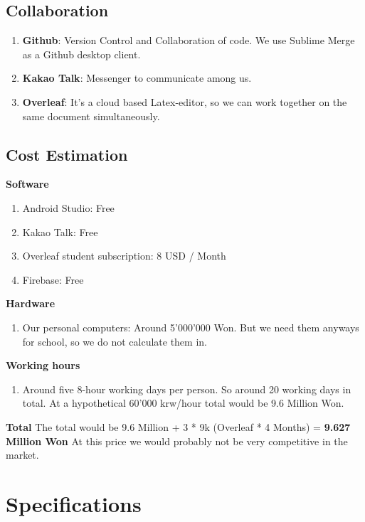 \documentclass[conference]{IEEEtran}
\numberwithin{figure}{subsection}
\begin{document}
\subsection{Collaboration}
\begin{enumerate}
 \item \textbf{Github}: Version Control and Collaboration of code. We use Sublime Merge as a Github desktop client.
 \newline
 \item \textbf{Kakao Talk}: Messenger to communicate among us.
 \newline
 \item \textbf{Overleaf}: It's a cloud based Latex-editor, so we can work together on the same document simultaneously.
 \newline
 \end{enumerate}

\subsection{Cost Estimation}
\textbf{Software}
\begin{enumerate}
\item Android Studio: Free
\item Kakao Talk: Free
\item Overleaf student subscription: 8 USD / Month
\item Firebase: Free
\end{enumerate}
\textbf{Hardware}
\begin{enumerate}
\item Our personal computers: Around 5'000'000 Won. But we need them anyways for school, so we do not calculate them in.
\end{enumerate}
\textbf{Working hours}
\begin{enumerate}
\item Around five 8-hour working days per person. So around 20 working days in total. At a hypothetical 60'000 krw/hour total would be  9.6 Million Won.
\end{enumerate}
\textbf{Total}
The total would be 9.6 Million + 3 * 9k (Overleaf * 4 Months) =\textbf{ 9.627 Million Won} At this price we would probably not be very competitive in the market.
\newline


\section{Specifications}
\end{document}
